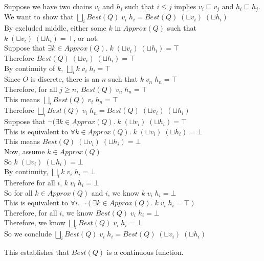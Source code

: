 \begin{itemize}
\begin{tabbedproof}
\oo Suppose we have two chains $v_i$ and $h_i$ such that $i \leq j$
implies $v_i \sqsubseteq v_j$ and $h_i \sqsubseteq h_j$. \\
\ooo We want to show that $\bigsqcup_i Best(Q)\;v_i\;h_i = Best(Q)\;(\sqcup v_i)\;(\sqcup h_i)$ \\
\ooo By excluded middle, either some $k$ in $Approx(Q)$ such that $k\;(\sqcup v_i)\;(\sqcup h_i) = \top$, or not. \\
\ooo Suppose that $\exists k \in Approx(Q).\; k\;(\sqcup v_i)\;(\sqcup h_i) = \top$ \\
\oooo Therefore $Best(Q)\;(\sqcup v_i)\;(\sqcup h_i) = \top$ \\
\oooo By continuity of $k$, $\bigsqcup_i k\;v_i\;h_i = \top$ \\
\oooo Since $O$ is discrete, there is an $n$ such that $k\;v_n\;h_n = \top$ \\
\oooo Therefore, for all $j \geq n$, $Best(Q)\;v_n\;h_n = \top$ \\
\oooo This means $\bigsqcup_i Best(Q)\;v_i\;h_n = \top$ \\
\oooo Therefore $\bigsqcup_i Best(Q)\;v_i\;h_n = Best(Q)\;(\sqcup v_i)\;(\sqcup h_i)$ \\
\ooo Suppose that $\lnot(\exists k \in Approx(Q).\; k\;(\sqcup v_i)\;(\sqcup h_i) = \top$ \\
\oooo This is equivalent to $\forall k \in Approx(Q).\; k\;(\sqcup v_i)\;(\sqcup h_i) = \bot$ \\
\oooo This means $Best(Q)\;(\sqcup v_i)\;(\sqcup h_i) = \bot$ \\
\oooo Now, assume $k \in Approx(Q)$ \\
\ooooo So $k\;(\sqcup v_i)\;(\sqcup h_i) = \bot$ \\
\ooooo By continuity, $\bigsqcup_i k\;v_i\;h_i = \bot$ \\
\ooooo Therefore for all $i$, $k\;v_i\;h_i = \bot$ \\
\oooo So for all $k \in Approx(Q)$ and $i$, we know $k\;v_i\;h_i = \bot$ \\
\oooo This is equivalent to $\forall i.\; \lnot(\exists k \in Approx(Q).\; k\;v_i\;h_i = \top)$\\
\oooo Therefore, for all $i$, we know $Best(Q)\;v_i\;h_i = \bot$ \\
\oooo Therefore, we know $\bigsqcup_i Best(Q)\;v_i\;h_i = \bot$ \\
\oooo So we conclude $\bigsqcup_i Best(Q)\;v_i\;h_i = Best(Q)\;(\sqcup v_i)\;(\sqcup h_i)$\\
\end{tabbedproof}
\end{itemize}
This establishes that $Best(Q)$ is a continuous function. 

